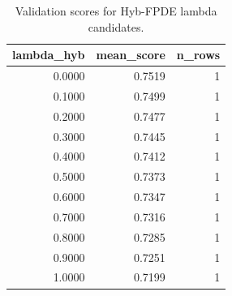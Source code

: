 \begin{table}[t]
\caption{Validation scores for Hyb-FPDE lambda candidates.}
\label{tab:lambda_distribution_computed}
\centering
\begin{tabular}{rrr}
\toprule
lambda\_hyb & mean\_score & n\_rows \\
\midrule
0.0000 & 0.7519 & 1 \\
0.1000 & 0.7499 & 1 \\
0.2000 & 0.7477 & 1 \\
0.3000 & 0.7445 & 1 \\
0.4000 & 0.7412 & 1 \\
0.5000 & 0.7373 & 1 \\
0.6000 & 0.7347 & 1 \\
0.7000 & 0.7316 & 1 \\
0.8000 & 0.7285 & 1 \\
0.9000 & 0.7251 & 1 \\
1.0000 & 0.7199 & 1 \\
\bottomrule
\end{tabular}

\end{table}
